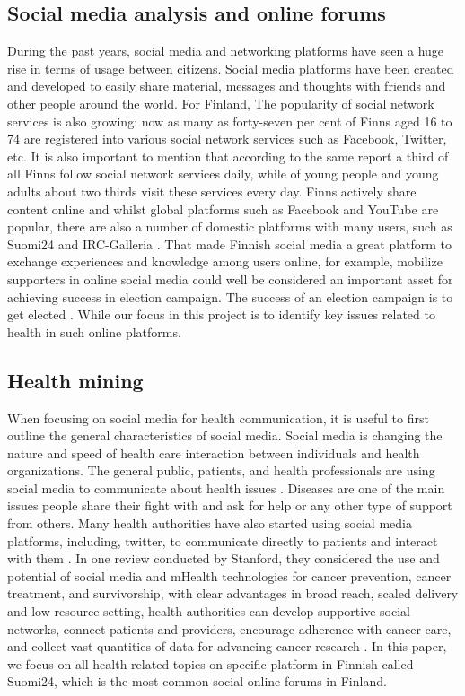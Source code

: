 \documentclass[conference]{IEEEtran}
\begin{document}
\subsection{Social media analysis and online forums}
During the past years, social media and networking platforms have seen a huge rise in terms of usage between citizens. Social media platforms have been created and developed to easily share material, messages and thoughts with friends and other people around the world. For Finland, The popularity of social network services is also growing: now as many as forty-seven per cent of Finns aged 16 to 74 are registered into various social network services such as Facebook, Twitter, etc. It is also important to mention that according to the same report a third of all Finns follow social network services daily, while of young people and young adults about two thirds visit these services every day. Finns actively share content online and whilst global platforms such as Facebook and YouTube are popular, there are also a number of domestic platforms with many users, such as Suomi24 and IRC-Galleria \cite{finland2015use}. That made Finnish social media a great platform to exchange experiences and knowledge among users online, for example, mobilize supporters in online social media could well be considered an important asset for achieving success in election campaign. The success of an election campaign is to get elected \cite{khaldarova2012publication}. While our focus in this project is to identify key issues related to health in such online platforms.

\subsection{Health mining}
When focusing on social media for health communication, it is useful to first outline the general characteristics of social media. Social media is changing the nature and speed of health care interaction between individuals and health organizations. The general public, patients, and health professionals are using social media to communicate about health issues \cite{thackeray2008enhancing}. Diseases are one of the main issues people share their fight with and ask for help or any other type of support from others. Many health authorities have also started using social media platforms, including, twitter, to communicate directly to patients and interact with them \cite{ventola2014social}. In one review conducted by Stanford, they considered the use and potential of social media and mHealth technologies for cancer prevention, cancer treatment, and survivorship, with clear advantages in broad reach, scaled delivery and low resource setting, health authorities can develop supportive social networks, connect patients and providers, encourage adherence with cancer care, and collect vast quantities of data for advancing cancer research \cite{prochaska2017social}. In this paper, we focus on all health related topics on specific platform in Finnish called Suomi24, which is the most common social online forums in Finland.
\end{document}

